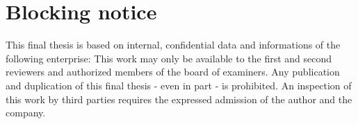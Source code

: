 
\chapter*{Blocking notice}

This final thesis is based on internal, confidential data and informations of the following enterprise:
This work may only be available to the first and second reviewers and authorized members of the
board of examiners. Any publication and duplication of this final thesis - even in part - is prohibited.
An inspection of this work by third parties requires the expressed admission of the author and the
company.